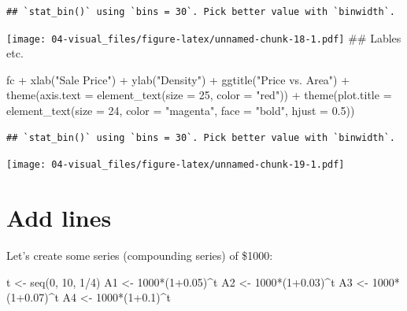 \documentclass[
]{book}
\newenvironment{Shaded}{\begin{snugshade}}{\end{snugshade}}
\newcommand{\AttributeTok}[1]{\textcolor[rgb]{0.77,0.63,0.00}{#1}}
\newcommand{\DecValTok}[1]{\textcolor[rgb]{0.00,0.00,0.81}{#1}}
\newcommand{\FloatTok}[1]{\textcolor[rgb]{0.00,0.00,0.81}{#1}}
\newcommand{\FunctionTok}[1]{\textcolor[rgb]{0.00,0.00,0.00}{#1}}
\newcommand{\NormalTok}[1]{#1}
\newcommand{\OtherTok}[1]{\textcolor[rgb]{0.56,0.35,0.01}{#1}}
\newcommand{\SpecialCharTok}[1]{\textcolor[rgb]{0.00,0.00,0.00}{#1}}
\newcommand{\StringTok}[1]{\textcolor[rgb]{0.31,0.60,0.02}{#1}}
\begin{document}
\begin{verbatim}
## `stat_bin()` using `bins = 30`. Pick better value with `binwidth`.
\end{verbatim}

\texttt{[image: 04-visual\_files/figure-latex/unnamed-chunk-18-1.pdf]}
\#\# Lables etc.

\begin{Shaded}
\begin{Highlighting}[]
\NormalTok{fc }\SpecialCharTok{+} 
  \FunctionTok{xlab}\NormalTok{(}\StringTok{"Sale Price"}\NormalTok{) }\SpecialCharTok{+} 
  \FunctionTok{ylab}\NormalTok{(}\StringTok{"Density"}\NormalTok{) }\SpecialCharTok{+} 
  \FunctionTok{ggtitle}\NormalTok{(}\StringTok{"Price vs. Area"}\NormalTok{) }\SpecialCharTok{+}
  \FunctionTok{theme}\NormalTok{(}\AttributeTok{axis.text =} \FunctionTok{element\_text}\NormalTok{(}\AttributeTok{size =} \DecValTok{25}\NormalTok{, }\AttributeTok{color =} \StringTok{"red"}\NormalTok{)) }\SpecialCharTok{+}
  \FunctionTok{theme}\NormalTok{(}\AttributeTok{plot.title =} \FunctionTok{element\_text}\NormalTok{(}\AttributeTok{size =} \DecValTok{24}\NormalTok{, }
                                     \AttributeTok{color =} \StringTok{"magenta"}\NormalTok{, }
                                     \AttributeTok{face =} \StringTok{"bold"}\NormalTok{,}
                                     \AttributeTok{hjust =} \FloatTok{0.5}\NormalTok{)) }
\end{Highlighting}
\end{Shaded}

\begin{verbatim}
## `stat_bin()` using `bins = 30`. Pick better value with `binwidth`.
\end{verbatim}

\texttt{[image: 04-visual\_files/figure-latex/unnamed-chunk-19-1.pdf]}

\hypertarget{add-lines}{%
\section{Add lines}\label{add-lines}}

Let's create some series (compounding series) of \$1000:

\begin{Shaded}
\begin{Highlighting}[]
\NormalTok{t }\OtherTok{\textless{}{-}} \FunctionTok{seq}\NormalTok{(}\DecValTok{0}\NormalTok{, }\DecValTok{10}\NormalTok{, }\DecValTok{1}\SpecialCharTok{/}\DecValTok{4}\NormalTok{)}
\NormalTok{A1 }\OtherTok{\textless{}{-}} \DecValTok{1000}\SpecialCharTok{*}\NormalTok{(}\DecValTok{1}\FloatTok{+0.05}\NormalTok{)}\SpecialCharTok{\^{}}\NormalTok{t}
\NormalTok{A2 }\OtherTok{\textless{}{-}} \DecValTok{1000}\SpecialCharTok{*}\NormalTok{(}\DecValTok{1}\FloatTok{+0.03}\NormalTok{)}\SpecialCharTok{\^{}}\NormalTok{t}
\NormalTok{A3 }\OtherTok{\textless{}{-}} \DecValTok{1000}\SpecialCharTok{*}\NormalTok{(}\DecValTok{1}\FloatTok{+0.07}\NormalTok{)}\SpecialCharTok{\^{}}\NormalTok{t}
\NormalTok{A4 }\OtherTok{\textless{}{-}} \DecValTok{1000}\SpecialCharTok{*}\NormalTok{(}\DecValTok{1}\FloatTok{+0.1}\NormalTok{)}\SpecialCharTok{\^{}}\NormalTok{t}
\end{Highlighting}
\end{Shaded}
\end{document}
